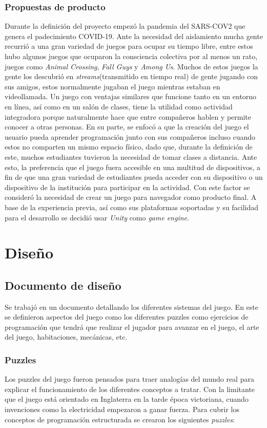 \subsubsection{Propuestas de producto}
Durante la definición del proyecto empezó la pandemia del SARS-COV2 que genera el padecimiento COVID-19. Ante la necesidad del aislamiento mucha gente recurrió a una gran variedad de juegos para ocupar su tiempo libre, entre estos hubo algunos juegos que ocuparon la consciencia colectiva por al menos un rato, juegos como \textit{Animal Crossing}, \textit{Fall Guys} y \textit{Among Us}. Muchos de estos juegos la gente los descubrió en \textit{streams}(transmitido en tiempo real) de gente jugando con sus amigos, estos normalmente jugaban el juego mientras estaban en videollamada. Un juego con ventajas similares que funcione tanto en un entorno en línea, así como en un salón de clases, tiene la utilidad como actividad integradora porque naturalmente hace que entre compañeros hablen y permite conocer a otras personas.
En su parte, se enfocó a que la creación del juego el usuario pueda aprender programación junto con sus compañeros incluso cuando estos no comparten un mismo espacio físico, dado que, durante la definición de este, muchos estudiantes tuvieron la necesidad de tomar clases a distancia. Ante esto, la preferencia que el juego fuera accesible en una multitud de dispositivos, a fin de que una gran variedad de estudiantes pueda acceder con su dispositivo o un dispositivo de la institución para participar en la actividad. Con este factor se consideró la necesidad de crear un juego para navegador como producto final. A base de la experiencia previa, así como sus plataformas soportadas y su facilidad para el desarrollo se decidió usar \textit{Unity} como \textit{game engine}.

\section{Diseño}
\subsection{Documento de diseño}
Se trabajó en un documento detallando los diferentes sistemas del juego. En este se definieron aspectos del juego como los diferentes puzzles como ejercicios de programación que tendrá que realizar el jugador para avanzar en el juego, el arte del juego, habitaciones, mecánicas, etc.

\subsubsection{Puzzles}
Los puzzles del juego fueron pensados para traer analogías del mundo real para explicar el funcionamiento de los diferentes conceptos a tratar. Con la limitante que el juego está orientado en Inglaterra en la tarde época victoriana, cuando invenciones como la electricidad empezaron a ganar fuerza.
Para cubrir los conceptos de programación estructurada se crearon los siguientes \textit{puzzles}:

